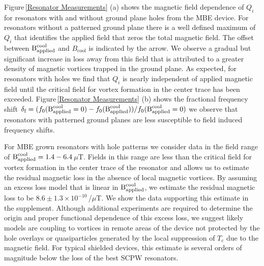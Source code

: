 \documentclass[aip,jap,reprint,nobalancelastpage]{revtex4-1}
\begin{document}
Figure\,\ref{Resonator Measurements} (a) shows the magnetic field dependence of $Q_i$ for resonators with and without ground plane holes from the MBE device.  For resonators without a patterned ground plane there is a well defined maximum of $Q_i$ that identifies the applied field that zeros the total magnetic field.\cite{chiaro2015supp}  The offset between $\text{B}^{\text{cool}}_{\text{applied}}$ and $B_{\textrm{cool}}$ is indicated by the arrow.  We observe a gradual but significant increase in loss away from this field that is attributed to a greater density of magnetic vortices trapped in the ground plane.  As expected, for resonators with holes we find that $Q_i$ is nearly independent of applied magnetic field until the critical field for vortex formation in the center trace has been exceeded.  Figure\,\ref{Resonator Measurements} (b) shows the fractional frequency shift  \mbox{$\delta_{\text{f}}=( f_{0}(\text{B}^{\text{cool}}_{\text{applied}}=0) - f_0(\text{B}^{\text{cool}}_{\text{applied}}))/f_{0}(\text{B}^{\text{cool}}_{\text{applied}}=0)$} we observe that resonators with patterned ground planes are less susceptible to field induced frequency shifts.

For MBE grown resonators with hole patterns we consider data in the field range of $\text{B}^{\text{cool}}_{\text{applied}}=1.4-6.4$\,$\mu\text{T}$.  Fields in this range are less than the critical field for vortex formation in the center trace of the resonator and allows us to estimate the residual magnetic loss in the absence of local magnetic vortices.  By assuming an excess loss model that is linear in $\text{B}^{\text{cool}}_{\text{applied}}$, we estimate the residual magnetic loss to be \mbox{$8.6 \pm 1.3 \times 10^{-10}$\,/$\mu\text{T}$.}  We show the data supporting this estimate in the supplement.\cite{chiaro2015supp}  Although additional experiments are required to determine the origin and proper functional dependence of this excess loss, we suggest likely models are coupling to vortices in remote areas of the device not protected by the hole overlays or quasiparticles generated by the local suppression of $T_c$ due to the magnetic field.  For typical shielded devices, this estimate is several orders of magnitude below the loss of the best SCPW resonators.\cite{megrant2012, ohya2014, bruno2015}
\end{document}
